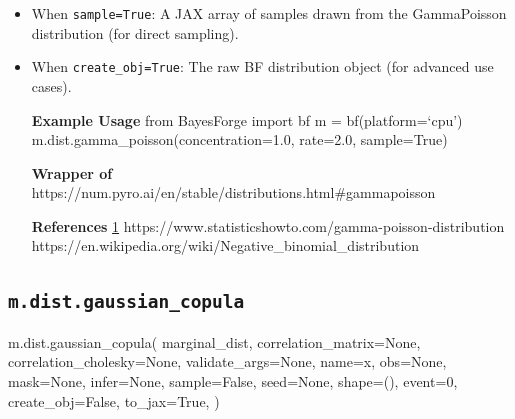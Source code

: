 \documentclass[
  letterpaper,
  DIV=11,
  numbers=noendperiod]{scrartcl}
\newenvironment{Shaded}{\begin{snugshade}}{\end{snugshade}}
\newcommand{\DecValTok}[1]{\textcolor[rgb]{0.68,0.00,0.00}{#1}}
\newcommand{\NormalTok}[1]{\textcolor[rgb]{0.00,0.23,0.31}{#1}}
\newcommand{\OperatorTok}[1]{\textcolor[rgb]{0.37,0.37,0.37}{#1}}
\newcommand{\StringTok}[1]{\textcolor[rgb]{0.13,0.47,0.30}{#1}}
\newcommand{\VariableTok}[1]{\textcolor[rgb]{0.07,0.07,0.07}{#1}}
\begin{document}
\begin{itemize}
\item
  When \texttt{sample=True}: A JAX array of samples drawn from the
  GammaPoisson distribution (for direct sampling).
\item
  When \texttt{create\_obj=True}: The raw BF distribution object (for
  advanced use cases).

  \textbf{Example Usage} from BayesForge import bf m =
  bf(platform=`cpu') m.dist.gamma\_poisson(concentration=1.0, rate=2.0,
  sample=True)

  \textbf{Wrapper of}
  https://num.pyro.ai/en/stable/distributions.html\#gammapoisson

  \textbf{References}
  \href{https://en.wikipedia.org/wiki/Matrix_normal_distribution}{1}
  https://www.statisticshowto.com/gamma-poisson-distribution
  https://en.wikipedia.org/wiki/Negative\_binomial\_distribution
\end{itemize}

\subsection{\texorpdfstring{\texttt{m.dist.gaussian\_copula}}{m.dist.gaussian\_copula}}\label{gaussian_copula}

\begin{Shaded}
\begin{Highlighting}[]
\NormalTok{m.dist.gaussian\_copula(}
\NormalTok{    marginal\_dist,}
\NormalTok{    correlation\_matrix}\OperatorTok{=}\VariableTok{None}\NormalTok{,}
\NormalTok{    correlation\_cholesky}\OperatorTok{=}\VariableTok{None}\NormalTok{,}
\NormalTok{    validate\_args}\OperatorTok{=}\VariableTok{None}\NormalTok{,}
\NormalTok{    name}\OperatorTok{=}\StringTok{\textquotesingle{}x\textquotesingle{}}\NormalTok{,}
\NormalTok{    obs}\OperatorTok{=}\VariableTok{None}\NormalTok{,}
\NormalTok{    mask}\OperatorTok{=}\VariableTok{None}\NormalTok{,}
\NormalTok{    infer}\OperatorTok{=}\VariableTok{None}\NormalTok{,}
\NormalTok{    sample}\OperatorTok{=}\VariableTok{False}\NormalTok{,}
\NormalTok{    seed}\OperatorTok{=}\VariableTok{None}\NormalTok{,}
\NormalTok{    shape}\OperatorTok{=}\NormalTok{(),}
\NormalTok{    event}\OperatorTok{=}\DecValTok{0}\NormalTok{,}
\NormalTok{    create\_obj}\OperatorTok{=}\VariableTok{False}\NormalTok{,}
\NormalTok{    to\_jax}\OperatorTok{=}\VariableTok{True}\NormalTok{,}
\NormalTok{)}
\end{Highlighting}
\end{Shaded}
\end{document}

